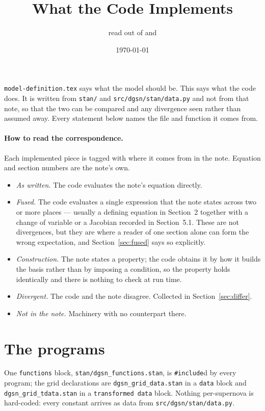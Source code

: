 \documentclass[11pt]{article}
\title{What the Code Implements}
\author{read out of \file{stan/} and \file{src/dgsn/stan/}}
\date{\today}
\newcommand{\file}[1]{\texttt{#1}}
\newcommand{\code}[1]{\texttt{#1}}
\begin{document}
\maketitle

\noindent
\file{model-definition.tex} says what the model should be. This says what the code does. It
is written from \file{stan/} and \file{src/dgsn/stan/data.py} and not from that note, so
that the two can be compared and any divergence seen rather than assumed away. Every
statement below names the file and function it comes from.

\paragraph{How to read the correspondence.} Each implemented piece is tagged with where it
comes from in the note. Equation and section numbers are the note's own.
\begin{itemize}
\item[\textbf{[=]}] \emph{As written.} The code evaluates the note's equation directly.
\item[\textbf{[+]}] \emph{Fused.} The code evaluates a single expression that the note states
  across two or more places --- usually a defining equation in Section~2 together with a
  change of variable or a Jacobian recorded in Section~5.1. These are not divergences, but
  they are where a reader of one section alone can form the wrong expectation, and
  Section~\ref{sec:fused} says so explicitly.
\item[\textbf{[c]}] \emph{Construction.} The note states a property; the code obtains it by
  how it builds the basis rather than by imposing a condition, so the property holds
  identically and there is nothing to check at run time.
\item[\textbf{[!]}] \emph{Divergent.} The code and the note disagree. Collected in
  Section~\ref{sec:differ}.
\item[\textbf{[0]}] \emph{Not in the note.} Machinery with no counterpart there.
\end{itemize}

\section{The programs}

One \code{functions} block, \file{stan/dgsn\_functions.stan}, is \code{\#include}d by every
program; the grid declarations are \file{dgsn\_grid\_data.stan} in a \code{data} block and
\file{dgsn\_grid\_tdata.stan} in a \code{transformed data} block. Nothing per-supernova is
hard-coded: every constant arrives as data from \file{src/dgsn/stan/data.py}.
\end{document}
